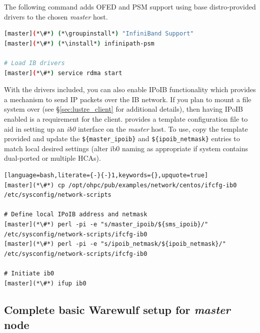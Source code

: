 \documentclass[letterpaper]{article}
\newcommand{\install}{yum -y install}
\newcommand{\groupinstall}{yum -y groupinstall}
\begin{document}
The following command adds OFED and PSM support using base distro-provided drivers
to the chosen {\em master} host.

\begin{lstlisting}[language=bash,keywords={}]
[master](*\#*) (*\groupinstall*) "InfiniBand Support"
[master](*\#*) (*\install*) infinipath-psm

# Load IB drivers
[master](*\#*) service rdma start
\end{lstlisting}

With the \InfiniBand{} drivers included, you can also enable IPoIB functionality
which provides a mechanism to send IP packets over the IB network. If you plan
to mount a \Lustre{} file system over \InfiniBand{} (see \S\ref{sec:lustre_client}
for additional details), then having IPoIB enabled is a requirement for the
\Lustre{} client. \OHPC{} provides a template configuration file to aid in setting up
an {\em ib0} interface on the {\em master} host. To use, copy the template
provided and update the \texttt{\$\{master\_ipoib\}} and
\texttt{\$\{ipoib\_netmask\}} entries to match local desired settings (alter ib0
naming as appropriate if system contains dual-ported or multiple HCAs). 

\begin{lstlisting}[language=bash,literate={-}{-}1,keywords={},upquote=true]
[master](*\#*) cp /opt/ohpc/pub/examples/network/centos/ifcfg-ib0 /etc/sysconfig/network-scripts

# Define local IPoIB address and netmask
[master](*\#*) perl -pi -e "s/master_ipoib/${sms_ipoib}/" /etc/sysconfig/network-scripts/ifcfg-ib0
[master](*\#*) perl -pi -e "s/ipoib_netmask/${ipoib_netmask}/" /etc/sysconfig/network-scripts/ifcfg-ib0

# Initiate ib0
[master](*\#*) ifup ib0
\end{lstlisting}

\subsection{Complete basic Warewulf setup for {\em master} node} \label{sec:setup_ww}


\end{document}
